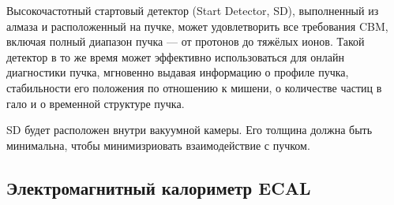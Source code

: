 Высокочастотный стартовый детектор (Start Detector, SD), выполненный из алмаза и расположенный на пучке, может удовлетворить все требования CBM, включая полный диапазон пучка --- от протонов до тяжёлых ионов.
Такой детектор в то же время может эффективно использоваться для онлайн диагностики пучка, мгновенно выдавая информацию о профиле пучка, стабильности его положения по отношению к мишени, о количестве частиц в гало \todo и о временной структуре пучка.


SD будет расположен внутри вакуумной камеры. Его толщина должна быть минимальна, чтобы минимизриовать взаимодействие с пучком.



\subsection{Электромагнитный калориметр ECAL}\label{sec:secECAL}

